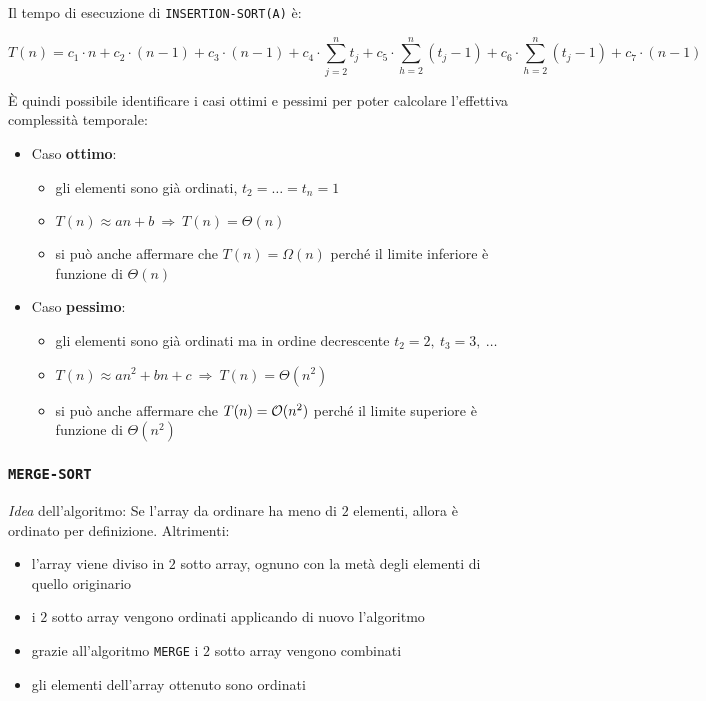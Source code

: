 \documentclass[italian, 10pt]{article}
\begin{document}
Il tempo di esecuzione di \texttt{INSERTION-SORT(A)} è:

\[ T(n) = c_1 \cdot n + c_2 \cdot (n-1) + c_3 \cdot (n-1) + c_4 \cdot \displaystyle \sum_{j=2}^n t_j + c_5 \cdot \displaystyle \sum_{h=2}^n (t_j - 1) + c_6 \cdot \displaystyle \sum_{h=2}^n (t_j - 1) + c_7 \cdot (n-1) \]

È quindi possibile identificare i casi ottimi e pessimi per poter calcolare l'effettiva complessità temporale:

\begin{itemize}
  \item Caso \textbf{ottimo}:
        \begin{itemize}
          \item gli elementi sono già ordinati, \(t_2 = \ldots = t_n = 1\)
          \item \(T(n) \approx an + b \ \Rightarrow \  T(n) = \Theta(n)\)
          \item si può anche affermare che \(T(n) = \Omega(n)\) perché il limite inferiore è funzione di \(\Theta(n)\)
        \end{itemize}
  \item Caso \textbf{pessimo}:
        \begin{itemize}
          \item gli elementi sono già ordinati ma in ordine decrescente \(t_2 = 2,\ t_3 = 3,\ \ldots\)
          \item \(T(n) \approx an^2 + bn + c \ \Rightarrow \ T(n) = \Theta(n^2)\)
          \item si può anche affermare che \(T(n) = \mathcal{O}(n^2)\) perché il limite superiore è funzione di \(\Theta(n^2)\)
        \end{itemize}
\end{itemize}

\subsubsection{\texttt{MERGE-SORT}}

\textit{Idea} dell'algoritmo:
Se l'array da ordinare ha meno di \(2\) elementi, allora è ordinato per definizione.
Altrimenti:
\begin{itemize}
  \item l'array viene diviso in \(2\) sotto array, ognuno con la metà degli elementi di quello originario
  \item i \(2\) sotto array vengono ordinati applicando di nuovo l'algoritmo
  \item grazie all'algoritmo \texttt{MERGE} i \(2\) sotto array vengono combinati
  \item gli elementi dell'array ottenuto sono ordinati
\end{itemize}
\end{document}
